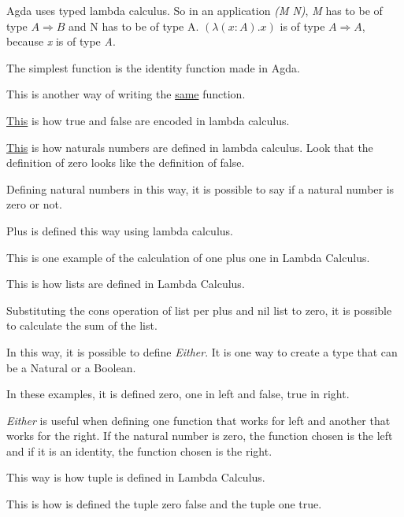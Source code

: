   Agda uses typed lambda calculus.
  So in an application \emph{(M N)}, \emph{M} has to be of type $A \Rightarrow B$ and N has to be of type A.
  $(\lambda (x : A) . x)$ is of type $A \Rightarrow A$, because \emph{x} is of type \emph{A}.

  The simplest function is the identity function made in Agda.

  This is another way of writing the \hyperref[id2]{same} function.

  \hyperref[truefalse]{This} is how true and false are encoded in lambda calculus.

  \hyperref[naturals]{This} is how naturals numbers are defined in lambda calculus.
  Look that the definition of zero looks like the definition of false.

  Defining natural numbers in this way, it is possible to say if a natural number is zero or not.

  Plus is defined this way using lambda calculus.

  This is one example of the calculation of one plus one in Lambda Calculus.

  This is how lists are defined in Lambda Calculus.

  Substituting the cons operation of list per plus and nil list to zero, it is possible to calculate
  the sum of the list.

  In this way, it is possible to define \emph{Either}.
  It is one way to create a type that can be a Natural or a Boolean.

  In these examples, it is defined zero, one in left and false, true in right.

  \emph{Either} is useful when defining one function that works for left and another that works for the right.
  If the natural number is zero, the function chosen is the left and
  if it is an identity, the function chosen is the right. 

  This way is how tuple is defined in Lambda Calculus.

  This is how is defined the tuple zero false and the tuple one true.

